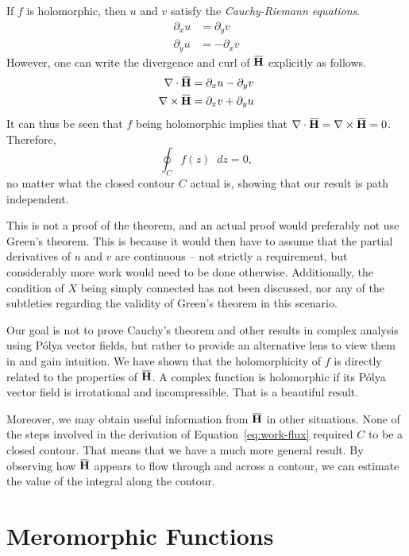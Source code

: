 \documentclass[a4paper]{article}
\newcommand*\diff{\mathop{}\!d} %
\newcommand{\overbar}[1]{\mkern 1.5mu\overline{\mkern-1.5mu#1\mkern-1.5mu}\mkern 1.5mu}
\theoremstyle{definition}
\begin{document}
If $f$ is holomorphic, then $u$ and $v$ satisfy the \emph{Cauchy-Riemann equations}.
\begin{align*}
    \partial_x u & = \partial_y v  \\
    \partial_y u & = -\partial_x v
\end{align*}
However, one can write the divergence and curl of $\mathbf{\overbar{H}}$ explicitly as follows.
\begin{align*}
    \nabla \cdot \mathbf{\overbar{H}}  & = \partial_x u - \partial_y v \\
    \nabla \times \mathbf{\overbar{H}} & = \partial_x v + \partial_y u
\end{align*}
It can thus be seen that $f$ being holomorphic implies that $\nabla \cdot \mathbf{\overbar{H}} = \nabla \times \mathbf{\overbar{H}} = 0$.
Therefore,
\begin{equation}
    \oint_C f(z) \diff z = 0,
\end{equation}
no matter what the closed contour $C$ actual is, showing that our result is path independent.

This is not a proof of the theorem, and an actual proof would preferably not use Green's theorem.
This is because it would then have to assume that the partial derivatives of $u$ and $v$ are continuous -- not strictly a requirement, but considerably more work would need to be done otherwise.
Additionally, the condition of $X$ being simply connected has not been discussed, nor any of the subtleties regarding the validity of Green's theorem in this scenario.

Our goal is not to prove Cauchy's theorem and other results in complex analysis using P\'olya vector fields, but rather to provide an alternative lens to view them in and gain intuition.
We have shown that the holomorphicity of $f$ is directly related to the properties of $\mathbf{\overbar{H}}$.
A complex function is holomorphic if its P\'olya vector field is irrotational and incompressible.
That is a beautiful result.

Moreover, we may obtain useful information from $\mathbf{\overbar{H}}$ in other situations.
None of the steps involved in the derivation of Equation~\eqref{eq:work-flux} required $C$ to be a closed contour.
That means that we have a much more general result.
By observing how $\mathbf{\overbar{H}}$ appears to flow through and across a contour, we can estimate the value of the integral along the contour.

\section{Meromorphic Functions}
\end{document}
